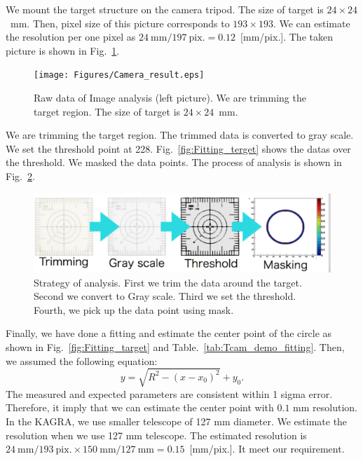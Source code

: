 We mount the target structure on the camera tripod. The size of target is $24 \times 24$~mm. Then, pixel size of this picture corresponds to $193 \times 193$. We can estimate the resolution per one pixel as $24~\mathrm{mm}/197~\mathrm{pix.}=0.12$~[mm/pix.]. The taken picture is shown in Fig.~\ref{fig:Camera_result}.
   \begin{figure}
\begin{center}
\texttt{[image: Figures/Camera\_result.eps]}
\caption{Raw data of Image analysis (left picture). We are trimming the target region. The size of target is $24 \times 24$~mm.} 
\label{fig:Camera_result} 
\end{center}
\end{figure}

We are trimming the target region. The trimmed data is converted to gray scale. We set the threshold point at 228.
Fig.~\ref{fig:Fitting_terget} shows the datas over the threshold.
We masked the data points.
The process of analysis is shown in Fig.~\ref{fig:Analysis_cam}.

   \begin{figure}
\begin{center}
\includegraphics[width=14cm]{Figures/Analysis_cam.eps}
\caption{Strategy of analysis. First we trim the data around the target. Second we convert to Gray scale. Third we set the threshold. Fourth, we pick up the data point using mask. } 
\label{fig:Analysis_cam} 
\end{center}
\end{figure}

Finally, we have done a fitting and estimate the center point of the circle as shown in Fig.~\ref{fig:Fitting_target} and Table.~\ref{tab:Tcam_demo_fitting}.
Then, we assumed the following equation:
\begin{equation}
y=\sqrt{R^2-(x-x_0)^2}+y_0.
\end{equation} 
The measured and expected parameters are consistent within 1 sigma error.
Therefore, it imply that we can estimate the center point with $0.1$ mm resolution.
In the KAGRA, we use smaller telescope of 127 mm diameter.
We estimate the resolution when we use 127 mm telescope.
The estimated resolution is $24~\mathrm{mm}/193~\mathrm{pix.}\times 150~\mathrm{mm}/127~\mathrm{mm}=0.15$~[mm/pix.]. It meet our requirement.

